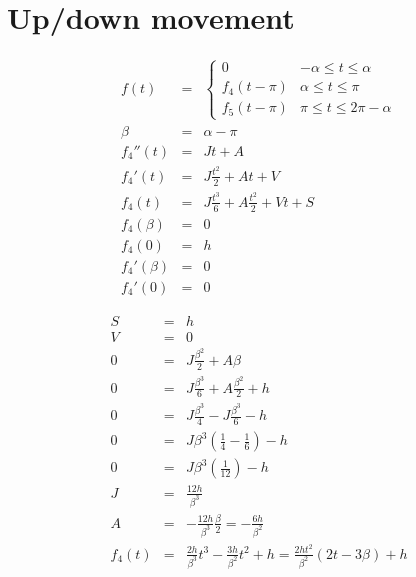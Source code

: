 \documentclass[a4,draft]{article}
\begin{document}
\section{Up/down movement}
\begin{eqnarray}
  f(t) &=& \begin{cases} 
    0 & -\alpha \leq t \le  \alpha\\
    f_4(t - \pi) & \alpha \leq t \le \pi \\
    f_5(t - \pi) & \pi \leq t \le  2\pi -\alpha
  \end{cases}\\
  \beta &=& \alpha - \pi \\
  f_4''(t) &=& Jt + A \\
  f_4'(t) &=& J\frac{t^2}{2} + At + V \\
  f_4(t) &=& J\frac{t^3}{6} + A\frac{t^2}{2} + Vt + S \\
  f_4(\beta) &=& 0 \\
  f_4(0) &=& h\\
  f_4'(\beta) &=& 0 \\
  f_4'(0) &=& 0
\end{eqnarray}

\begin{eqnarray}
  S &=& h \\
  V &=& 0 \\
  0 &=& J\frac{\beta^2}{2} + A\beta \\
  0 &=& J\frac{\beta^3}{6} + A\frac{\beta^2}{2} + h\\
  0 &=& J\frac{\beta^3}{4} - J\frac{\beta^3}{6} - h\\
  0 &=& J\beta^3\left(\frac{1}{4} - \frac{1}{6}\right) - h\\
  0 &=& J\beta^3\left(\frac{1}{12}\right) - h\\
  J &=& \frac{12h}{\beta^3} \\
  A&=&-\frac{12h}{\beta^3}\frac{\beta}{2}=-\frac{6h}{\beta^2}\\
  f_4(t) &=& \frac{2h}{\beta^3}t^3 - \frac{3h}{\beta^2}t^2 + h = \frac{2ht^2}{\beta^2}(2t - 3\beta) + h
\end{eqnarray}
\end{document}
